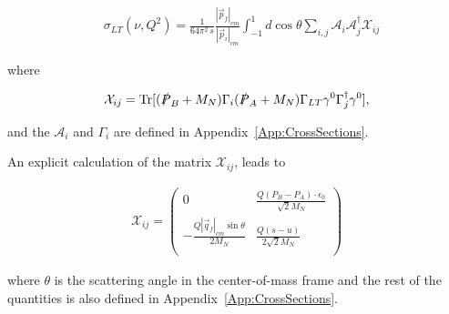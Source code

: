 \documentclass[prc,twocolumn,showpacs,preprintnumbers,amsmath,amssymb
,superscriptaddress,a4paper,nofootinbib
]{revtex4-1}
\begin{document}
\begin{align}\label{Eq:Derivation-LT2}
&\sigma_{LT}(\nu,Q^2)=\frac{1}{64\pi^2\,s}\frac{|\vec{p}_f|_{cm}}{|\vec{p}_i|_{cm}} \int_{-1}^{1}\!\!\!\! d\!\cos\!\theta \sum_{i,j} \mathcal{A}_i  \mathcal{A}^\dagger_j \mathcal{X}_{ij} 
\end{align}

where 

\begin{align}
\mathcal{X}_{ij}=\text{Tr}[(\slashed{P}_B+M_N)\Gamma_i(\slashed{P}_A+M_N)\Gamma_{LT}\gamma^0\Gamma_j^\dagger\gamma^0 ],
\end{align}

and the $\mathcal{A}_i$ and $\Gamma_i$ are defined in Appendix~\ref{App:CrossSections}.

An explicit calculation of the matrix $\mathcal{X}_{ij}$, leads to

\begin{align}
 \mathcal{X}_{ij}=\left(\begin{array}{cc}
  0   & \frac{Q (P_B-P_A)\cdot \epsilon_0}{\sqrt{2} M_N} \\
 -\frac{Q |\vec{q}_f|_{cm} \sin\theta}{ 2 M_N} &  \frac{Q(s-u)}{2\sqrt{2}M_N} \\
 \end{array}
 \right)
 \end{align}


where $\theta$ is the scattering angle in the center-of-mass frame and the rest of the quantities is also defined in Appendix~\ref{App:CrossSections}.
\end{document}
